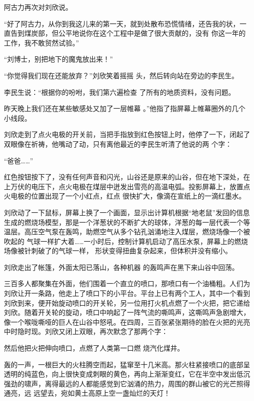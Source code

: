 \documentclass{article}
\begin{document}
阿古力再次对刘欣说。 

“好了阿古力，从你到我这儿来的第一天，就到处散布恐慌情绪，还告我的状，一直告到煤炭部，但公平地说你在这个工程中是做了很大贡献的，没有
你这一年的工作，我不敢贸然试验。” 


“刘博士，别把地下的魔鬼放出来！” 

“你觉得我们现在还能放弃？”刘欣笑着摇摇
头，然后转向站在旁边的李民生。 

李民生说：“根据你的吩咐，我们第六遍检查
了所有的地质资料，没有问题。 

\newpage

昨天晚上我们还在某些敏感处又加了一层帷幕
。”他指了指屏幕上帷幕圈外的几个小线段。 

刘欣走到了点火电极的开关前，当把手指放到红色按钮上时，他停了一下，闭起了双眼像在祈祷，他嘴动了动，只有离他最近的李民生听清了他说的两
个字： 


“爸爸……” 

红色按钮按下了，没有任何声音和闪光，山谷还是原来的山谷，但在地下深处，在上万伏的电压下，点火电极在煤层中迸发出雪亮的高温电弧。投影屏幕上，放置点火电极的位置出现了一个小红点，红点
很快扩大，像滴在宣纸上的一滴红墨水。 

刘欣动了一下鼠标，屏幕上换了一个画面，显示出计算机根据“地老鼠”发回的信息生成的燃烧场模型，那是一个洋葱状的不断扩大的球体，洋葱的每一层代表一个等温层。高压空气泵在轰鸣，助燃空气从多个钻孔汹涌地注入煤层，燃烧场像一个被吹起的
\newpage
气球一样扩大着……一小时后，控制计算机启动了高压水泵，屏幕上的燃烧场像被针刺破了的气球一样，
形状变得扭曲复杂起来，但体积并没有缩小。 

刘欣走出了帐篷，外面太阳已落山，各种机器
的轰鸣声在黑下来山谷中回荡。 

三百多人都聚集在外面，他们围着一个直立的喷口，那喷口有一个油桶粗。人们为刘欣让开一条路，他走上了喷口下的小平台。平台上已有两个工人，其中一个看到刘欣到来，便开始旋动喷口的开关轮，另一位用打火机点燃了一个火把，把它递给刘欣。随着开关轮的旋动，喷口中响起了一阵气流的嘶鸣声，这嘶鸣声急剧增大，像一个喉咙嘶哑的巨人在山谷中怒吼。在四周，三百张紧张期待的脸在火把的光亮中时隐时现。刘欣又闭上双眼，再次默念了那两个字：


然后他把火把伸向喷口，点燃了人类第一口燃
烧汽化煤井。 

\newpage

轰的一声，一根巨大的火柱腾空而起，猛窜至十几米高。那火柱紧接喷口的底部呈透明的纯蓝色，向上很快变成刺眼的黄色，再向上渐渐变红，它在半空中发出低沉强劲的啸声，离得最远的人都能感觉到它汹涌的热力，周围的群山被它的光芒照得通亮，远
远望去，宛如黄土高原上空一盏灿烂的天灯！ 
\end{document}
